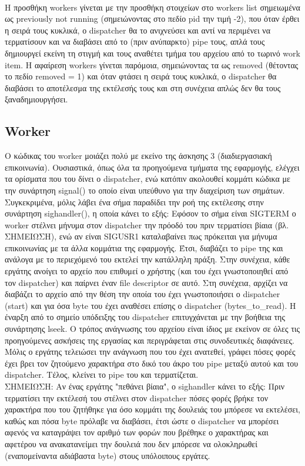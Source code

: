 \documentclass{article}
\begin{document}
	\\
	Η προσθήκη workers γίνεται με την προσθήκη στοιχείων στο workers list σημειωμένα ως previously not running (σημειώνοντας στο πεδίο pid την τιμή -2), που όταν έρθει η σειρά τους κυκλικά, ο dispatcher θα το ανιχνεύσει και αντί να περιμένει να τερματίσουν και να διαβάσει από το (πριν ανύπαρκτο) pipe τους, απλά τους δημιουργεί εκείνη τη στιγμή και τους αναθέτει τμήμα του αρχείου από το τωρινό work item. Η αφαίρεση workers γίνεται παρόμοια, σημειώνοντας τα ως removed (θέτοντας το πεδίο removed = 1) και όταν φτάσει η σειρά τους κυκλικά, ο dispatcher θα διαβάσει το αποτέλεσμα της εκτέλεσής τους και στη συνέχεια απλώς δεν θα τους ξαναδημιουργήσει.

	\subsection{Worker}

	Ο κώδικας του worker μοιάζει πολύ με εκείνο της άσκησης 3 (διαδιεργασιακή επικοινωνία). Ουσιαστικά, όπως όλα τα προηγούμενα τμήματα της εφαρμογής, ελέγχει τα ορίσματα που του δίνει ο dispatcher, ενώ κατόπιν ακολουθεί κομμάτι κώδικα με την συνάρτηση signal() το οποίο είναι υπεύθυνο για την διαχείριση των σημάτων. Συγκεκριμένα, μόλις λάβει ένα σήμα παραδίδει την ροή της εκτέλεσης στην συνάρτηση sighandler(), η οποία κάνει το εξής: Εφόσον το σήμα είναι SIGTERM ο worker στέλνει μήνυμα στον dispatcher την πρόοδό του πριν τερματίσει βίαια (βλ. ΣΗΜΕΙΩΣΗ), ενώ αν είναι SIGUSR1 καταλαβαίνει πως πρόκειται για μήνυμα επικοινωνίας με τα άλλα κομμάτια της εφαρμογής. Έτσι, διαβάζει το pipe της και ανάλογα με το περιεχόμενό του εκτελεί την κατάλληλη πράξη. Στην συνέχεια, κάθε εργάτης ανοίγει το αρχείο που επιθυμεί ο χρήστης (και του έχει γνωστοποιηθεί από τον dispatcher) και παίρνει έναν file descriptor σε αυτό. Στη συνέχεια, αρχίζει να διαβάζει το αρχείο από την θέση την οποία του έχει γνωστοποιήσει ο dispatcher (start) και για όσα byte του έχει αναθέσει επίσης ο dispatcher (bytes\_to\_read). Η έναρξη από το σημείο υπόδειξης του dispatcher επιτυγχάνεται με την βοήθεια της συνάρτησης lseek. Ο τρόπος ανάγνωσης του αρχείου είναι ίδιος με εκείνον σε όλες τις προηγούμενες ασκήσεις της εργασίας και περιγράφεται στις συνοδευτικές διαφάνειες. Μόλις ο εργάτης τελειώσει την ανάγνωση που του έχει ανατεθεί, γράφει πόσες φορές έχει βρει τον ζητούμενο χαρακτήρα στο δικό του άκρο του pipe μεταξύ αυτού και του dispatcher. Τέλος, κλείνει το pipe του και τερματίζεται. \\

\noindent ΣΗΜΕΙΩΣΗ: Αν ένας εργάτης "πεθάνει βίαια", ο sighandler κάνει το εξής: Πριν τερματίσει την εκτέλεσή του στέλνει στον dispatcher πόσες φορές βρήκε τον χαρακτήρα που του ζητήθηκε για όσο κομμάτι της δουλειάς του μπόρεσε να εκτελέσει, καθώς και πόσα byte πρόλαβε να διαβάσει, έτσι ώστε ο dispatcher να μπορέσει αφενός να καταγράψει τον αριθμό των φορών που βρέθηκε ο χαρακτήρας και αφετέρου να ανακατανείμει την δουλειά που δεν μπόρεσε να ολοκληρωθεί (εναπομείναντα αδιάβαστα byte) στους υπόλοιπους εργάτες.
	
\end{document}
